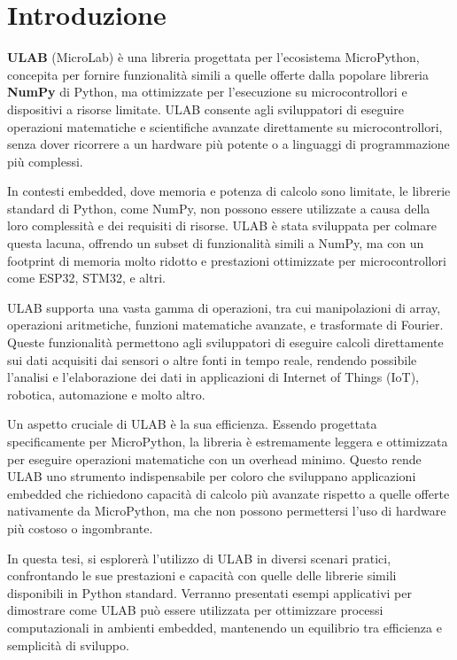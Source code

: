 \documentclass[12pt,a4paper]{report}
\begin{document}
\section{Introduzione}\label{introduzione-1}

\textbf{ULAB} (MicroLab) è una libreria progettata per
l'ecosistema MicroPython, concepita per fornire
funzionalità simili a quelle offerte dalla popolare libreria
\textbf{NumPy} di Python, ma ottimizzate per
l'esecuzione su microcontrollori e dispositivi a risorse
limitate. ULAB consente agli sviluppatori di eseguire operazioni
matematiche e scientifiche avanzate direttamente su microcontrollori,
senza dover ricorrere a un hardware più potente o a linguaggi di
programmazione più complessi.

In contesti embedded, dove memoria e potenza di calcolo sono limitate,
le librerie standard di Python, come NumPy, non possono essere
utilizzate a causa della loro complessità e dei requisiti di risorse.
ULAB è stata sviluppata per colmare questa lacuna, offrendo un subset di
funzionalità simili a NumPy, ma con un footprint di memoria molto
ridotto e prestazioni ottimizzate per microcontrollori come ESP32,
STM32, e altri.

ULAB supporta una vasta gamma di operazioni, tra cui manipolazioni di
array, operazioni aritmetiche, funzioni matematiche avanzate, e
trasformate di Fourier. Queste funzionalità permettono agli sviluppatori
di eseguire calcoli direttamente sui dati acquisiti dai sensori o altre
fonti in tempo reale, rendendo possibile l'analisi e
l'elaborazione dei dati in applicazioni di Internet of
Things (IoT), robotica, automazione e molto altro.

Un aspetto cruciale di ULAB è la sua efficienza. Essendo progettata
specificamente per MicroPython, la libreria è estremamente leggera e
ottimizzata per eseguire operazioni matematiche con un overhead minimo.
Questo rende ULAB uno strumento indispensabile per coloro che sviluppano
applicazioni embedded che richiedono capacità di calcolo più avanzate
rispetto a quelle offerte nativamente da MicroPython, ma che non possono
permettersi l'uso di hardware più costoso o ingombrante.

In questa tesi, si esplorerà l'utilizzo di ULAB in
diversi scenari pratici, confrontando le sue prestazioni e capacità con
quelle delle librerie simili disponibili in Python standard. Verranno
presentati esempi applicativi per dimostrare come ULAB può essere
utilizzata per ottimizzare processi computazionali in ambienti embedded,
mantenendo un equilibrio tra efficienza e semplicità di sviluppo.
\end{document}
